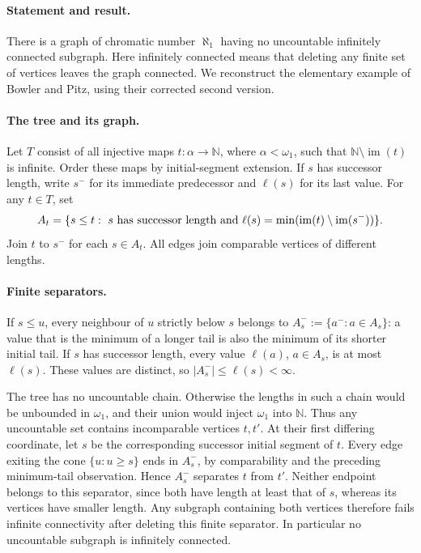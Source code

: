 \paragraph{Statement and result.}
There is a graph of chromatic number \(\aleph_1\) having no uncountable infinitely connected subgraph. Here infinitely connected means that deleting any finite set of vertices leaves the graph connected. We reconstruct the elementary example of Bowler and Pitz, using their corrected second version.

\paragraph{The tree and its graph.}
Let \(T\) consist of all injective maps \(t:\alpha\to\mathbb N\), where \(\alpha<\omega_1\), such that \(\mathbb N\setminus\operatorname{im}(t)\) is infinite. Order these maps by initial-segment extension. If \(s\) has successor length, write \(s^-\) for its immediate predecessor and \(\ell(s)\) for its last value. For any \(t\in T\), set
\[
 A_t=\{s\leq t:\ s\hbox{ has successor length and }
 \ell(s)=\min(\operatorname{im}(t)\setminus\operatorname{im}(s^-))\}.
\]
Join \(t\) to \(s^-\) for each \(s\in A_t\). All edges join comparable vertices of different lengths.

\paragraph{Finite separators.}
If \(s\leq u\), every neighbour of \(u\) strictly below \(s\) belongs to
\(A_s^-:=\{a^-:a\in A_s\}\): a value that is the minimum of a longer tail is also the minimum of its shorter initial tail. If \(s\) has successor length, every value \(\ell(a)\), \(a\in A_s\), is at most \(\ell(s)\). These values are distinct, so \(|A_s^-|\leq\ell(s)<\infty\).

The tree has no uncountable chain. Otherwise the lengths in such a chain would be unbounded in \(\omega_1\), and their union would inject \(\omega_1\) into \(\mathbb N\). Thus any uncountable set contains incomparable vertices \(t,t'\). At their first differing coordinate, let \(s\) be the corresponding successor initial segment of \(t\). Every edge exiting the cone \(\{u:u\geq s\}\) ends in \(A_s^-\), by comparability and the preceding minimum-tail observation. Hence \(A_s^-\) separates \(t\) from \(t'\). Neither endpoint belongs to this separator, since both have length at least that of \(s\), whereas its vertices have smaller length. Any subgraph containing both vertices therefore fails infinite connectivity after deleting this finite separator. In particular no uncountable subgraph is infinitely connected.

